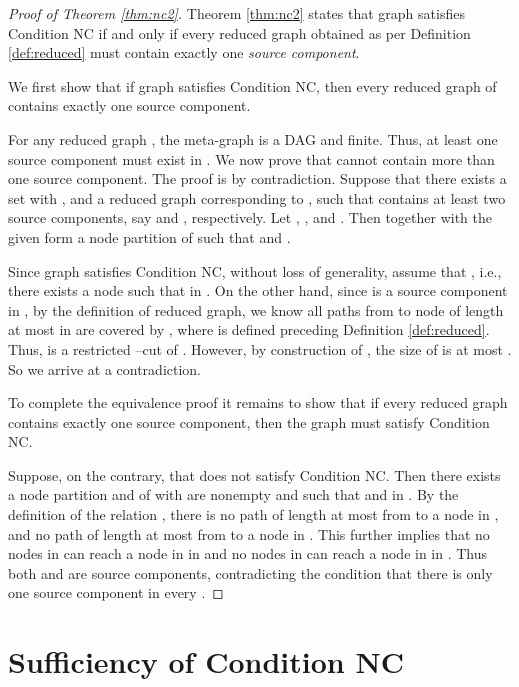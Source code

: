 \documentclass[letterpaper, 11pt]{article}
\begin{document}
\begin{proof}[Proof of Theorem \ref{thm:nc2}]
Theorem \ref{thm:nc2} states that graph  satisfies Condition NC if and only if every reduced graph  obtained as per Definition \ref{def:reduced}
must contain exactly one {\em source component}.


We first show that if graph  satisfies Condition NC, then every reduced graph of  contains exactly one source component.

 For any reduced graph , the meta-graph  is a DAG and finite. Thus, at least one source component must exist in .
 We now prove that  cannot
contain more than one source component. The proof is by contradiction.
Suppose that there exists a set  with , and a reduced graph
 corresponding to , such
that  contains at least two source components, say  and , respectively.
Let , , and . Then  together with the given  form a node partition of  such that  and .

Since graph  satisfies Condition NC, without loss of generality, assume that , i.e., there exists a node  such that  in .
On the other hand,
since  is a source component in , by the definition of reduced graph, we know all paths from  to node  of length at most  in  are covered by , where  is defined preceding Definition \ref{def:reduced}.
Thus,  is a restricted --cut of . However, by construction of , the size of  is at most . So we arrive at a contradiction.

To complete the equivalence proof it remains to show that if every reduced graph contains exactly one source component, then the graph must satisfy Condition NC.

Suppose, on the contrary, that  does not satisfy Condition NC. Then there exists a node partition  and  of  with  are nonempty and  such that  and  in . By the definition of the relation , there is no path of length at most  from  to a node in , and no path of length at most  from  to a node in . This further implies that no nodes in  can reach a node in  in  and no nodes in  can reach a node in  in . Thus both  and  are source components, contradicting the condition that there is only one source component in every .

\end{proof}






\section{Sufficiency of Condition NC}\label{sec:sufficiencyProof}
\end{document}
